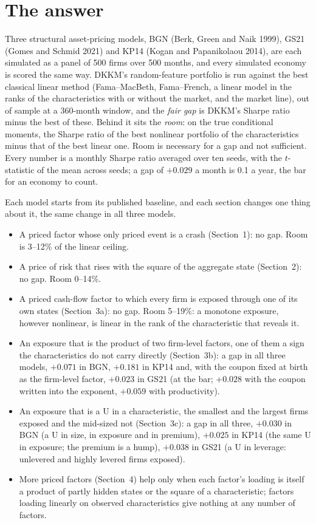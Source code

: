 \documentclass[11pt]{article}
\begin{document}
\section{The answer}

Three structural asset-pricing models, BGN (Berk, Green and Naik 1999), GS21 (Gomes and Schmid 2021) and KP14 (Kogan and Papanikolaou 2014), are each simulated as a panel of 500 firms over 500 months, and every simulated economy is scored the same way. DKKM's random-feature portfolio is run against the best classical linear method (Fama--MacBeth, Fama--French, a linear model in the ranks of the characteristics with or without the market, and the market line), out of sample at a 360-month window, and the \emph{fair gap} is DKKM's Sharpe ratio minus the best of these. Behind it sits the \emph{room}: on the true conditional moments, the Sharpe ratio of the best nonlinear portfolio of the characteristics minus that of the best linear one. Room is necessary for a gap and not sufficient. Every number is a monthly Sharpe ratio averaged over ten seeds, with the $t$-statistic of the mean across seeds; a gap of $+0.029$ a month is 0.1 a year, the bar for an economy to count.

Each model starts from its published baseline, and each section changes one thing about it, the same change in all three models.
\begin{itemize}
\item A priced factor whose only priced event is a crash (Section~1): no gap. Room is 3--12\% of the linear ceiling.
\item A price of risk that rises with the square of the aggregate state (Section~2): no gap. Room 0--14\%.
\item A priced cash-flow factor to which every firm is exposed through one of its own states (Section~3a): no gap. Room 5--19\%: a monotone exposure, however nonlinear, is linear in the rank of the characteristic that reveals it.
\item An exposure that is the product of two firm-level factors, one of them a sign the characteristics do not carry directly (Section~3b): a gap in all three models, $+0.071$ in BGN, $+0.181$ in KP14 and, with the coupon fixed at birth as the firm-level factor, $+0.023$ in GS21 (at the bar; $+0.028$ with the coupon written into the exponent, $+0.059$ with productivity).
\item An exposure that is a U in a characteristic, the smallest and the largest firms exposed and the mid-sized not (Section~3c): a gap in all three, $+0.030$ in BGN (a U in size, in exposure and in premium), $+0.025$ in KP14 (the same U in exposure; the premium is a hump), $+0.038$ in GS21 (a U in leverage: unlevered and highly levered firms exposed).
\item More priced factors (Section~4) help only when each factor's loading is itself a product of partly hidden states or the square of a characteristic; factors loading linearly on observed characteristics give nothing at any number of factors.
\end{itemize}
\end{document}
